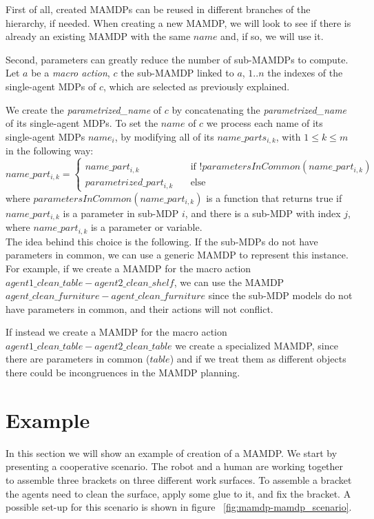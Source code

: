 First of all, created MAMDPs can be reused in different branches of the hierarchy, if needed. When creating a new MAMDP, we will look to see if there is already an existing MAMDP with the same $name$ and, if so, we will use it.

Second, parameters can greatly  reduce the number of sub-MAMDPs to compute. Let $a$ be a \textit{macro action}, $c$ the sub-MAMDP linked to $a$, $1..n$ the indexes of the single-agent MDPs of $c$, which are selected as previously explained.

 We create the \textit{parametrized\_name} of $c$ by concatenating the \textit{parametrized\_name} of its single-agent MDPs. To set the $name$ of  $c$ we process each name of its single-agent MDPs $name_i$, by modifying all of its $name\_parts_{i,k}$, with $1 \leq k \leq m$ in the following way:\\
$name\_part_{i,k}=
\begin{cases}
	name\_part_{i,k} & \quad \text{if } !parametersInCommon(name\_part_{i,k}) \\
	parametrized\_part_{i,k} & \quad \text{else}
\end{cases}$ \\
where $parametersInCommon(name\_part_{i,k})$ is a function that returns true if $name\_part_{i,k}$ is a parameter in sub-MDP $i$, and there is a sub-MDP with index $j$, where $name\_part_{i,k}$ is a parameter or variable. \\

The idea behind this choice is the following. If the sub-MDPs do not have parameters in common, we can use a generic MAMDP to represent this instance. For example, if we create a MAMDP for the macro action $agent1\_clean\_table-agent2\_clean\_shelf$, we can use the MAMDP $agent\_clean\_furniture-agent\_clean\_furniture$ since the sub-MDP models do not have parameters in common, and their actions will not conflict.

 If instead we create a MAMDP for the macro action $agent1\_clean\_table-agent2\_clean\_table$ we create a specialized MAMDP, since there are parameters in common ($table$) and if we treat them as different objects there could be incongruences in the MAMDP planning.



\section{Example}
\label{sec:mamdp-example}
In this section we will show an example of creation of a MAMDP. We start by presenting a cooperative scenario. The robot and a human are working together to assemble three brackets on three different work surfaces. To assemble a bracket the agents need to clean the surface, apply some glue to it, and fix the bracket. A possible set-up for this scenario is shown in figure ~\ref{fig:mamdp-mamdp_scenario}.

